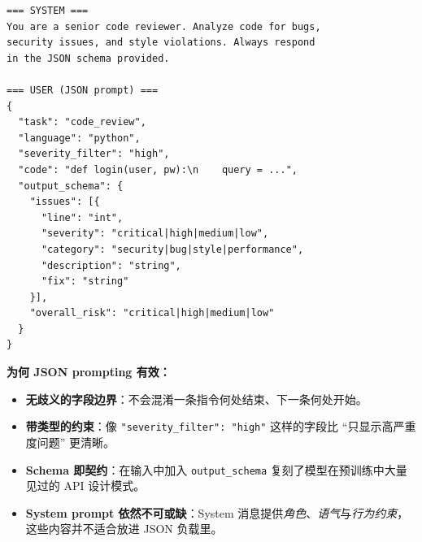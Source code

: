 \begin{examplebox}
\begin{lstlisting}
=== SYSTEM ===
You are a senior code reviewer. Analyze code for bugs,
security issues, and style violations. Always respond
in the JSON schema provided.

=== USER (JSON prompt) ===
{
  "task": "code_review",
  "language": "python",
  "severity_filter": "high",
  "code": "def login(user, pw):\n    query = ...",
  "output_schema": {
    "issues": [{
      "line": "int",
      "severity": "critical|high|medium|low",
      "category": "security|bug|style|performance",
      "description": "string",
      "fix": "string"
    }],
    "overall_risk": "critical|high|medium|low"
  }
}
\end{lstlisting}

\textbf{为何 JSON prompting 有效：}

\begin{itemize}
  \item \textbf{无歧义的字段边界}：不会混淆一条指令何处结束、下一条何处开始。
  \item \textbf{带类型的约束}：像 \texttt{"severity\_filter": "high"} 这样的字段比 ``只显示高严重度问题'' 更清晰。
  \item \textbf{Schema 即契约}：在输入中加入 \texttt{output\_schema} 复刻了模型在预训练中大量见过的 API 设计模式。
  \item \textbf{System prompt 依然不可或缺}：System 消息提供\emph{角色}、\emph{语气}与\emph{行为约束}，这些内容并不适合放进 JSON 负载里。
\end{itemize}
\end{examplebox}

